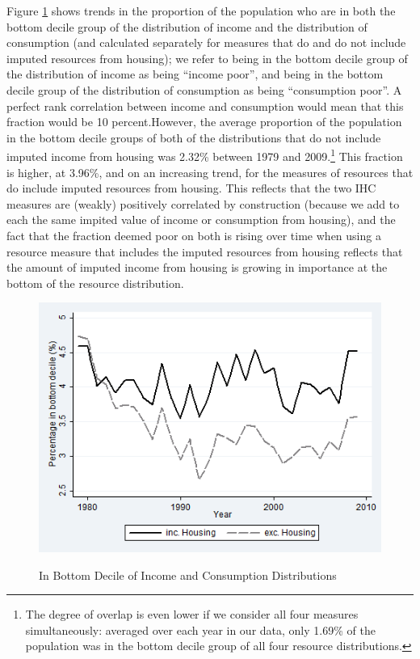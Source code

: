 Figure \ref{fig:overlap} shows trends in the proportion of the population who are in both the bottom decile group of the distribution of income and the distribution of consumption (and calculated separately for measures that do and do not include imputed resources from housing); we refer to being in the bottom decile group of the distribution of income as being ``income poor'', and being in the bottom decile group of the distribution of consumption as being ``consumption poor''. A perfect rank correlation between income and consumption would mean that this fraction would be 10 percent.However, the average proportion of the population in the bottom decile groups of both of the distributions that do not include imputed income from housing was 2.32\% between 1979 and 2009.\footnote{The degree of overlap is even lower if we consider all four measures simultaneously: averaged over each year in our data, only 1.69\% of the population was in the bottom decile group of all four resource distributions.} This fraction is higher, at 3.96\%, and on an increasing trend, for the measures of resources that do include imputed resources from housing. This reflects that the two IHC measures are (weakly) positively correlated by construction (because we add to each the same impited value of income or consumption from housing), and the fact that the fraction deemed poor on both is rising over time when using a resource measure that includes the imputed resources from housing reflects that the amount of imputed income from housing is growing in importance at the bottom of the resource distribution.

\begin{figure}
\caption{In Bottom Decile of Income and Consumption Distributions}
\centering
\includegraphics[width=.7\linewidth]{pictures/overlap.png}
\label{fig:overlap}
\end{figure}


